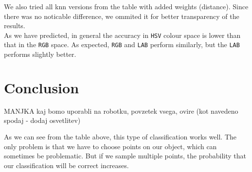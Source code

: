\documentclass[12pt,a4paper]{article}
\begin{document}
	We also tried all knn versions from the table with added weights (distance). Since there was no noticable difference, we ommited it for better transparency of the results. \\

	As we have predicted, in general the accuracy in \texttt{HSV} colour space is lower than that in the \texttt{RGB} space. As expected, \texttt{RGB} and \texttt{LAB} perform similarly, but the \texttt{LAB} performs slightly better. \\
	
	

	
	\section{Conclusion}

	MANJKA kaj bomo uporabli na robotku, povzetek vsega, ovire (kot navedeno spodaj - dodaj osvetlitev)
	
	As we can see from the table above, this type of classification works well. The only problem is that we have to choose points on our object, which can sometimes be problematic. But if we sample multiple points, the probability that our classification will be correct increases.

	
	
\end{document}
